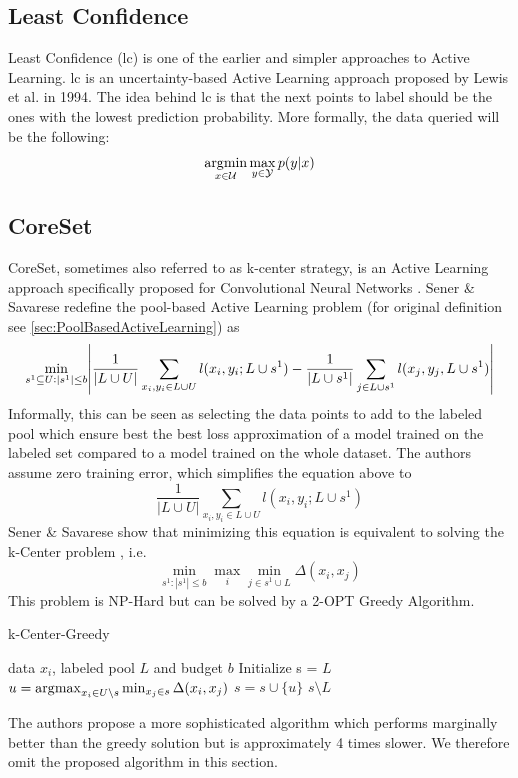 \subsection{Least Confidence}
\label{sec:Related_work:Active_Learning:Least_Confidence}
Least Confidence (\gls{lc}) is one of the earlier and simpler approaches to Active Learning. \gls{lc} is an uncertainty-based Active Learning
approach proposed by Lewis et al. \cite{lewis1994sequential} in 1994. The idea behind \gls{lc} is that the next points to label should be the 
ones with the lowest prediction probability. More formally, the data queried will be the following:
\begin{equation}
    \operatorname*{\arg\!\min}_{x \in \mathcal{U}} \max_{y \in \mathcal{Y}} p(y|x)
\end{equation}

\subsection{CoreSet}
\label{sec:Related_work:Active_Learning:CoreSet}
CoreSet, sometimes also referred to as k-center strategy, is an Active Learning approach specifically proposed for Convolutional Neural
Networks \cite{sener2017active}. Sener \& Savarese redefine the pool-based Active Learning problem (for original definition see 
\ref{sec:PoolBasedActiveLearning}) as 
\begin{equation}
    \min_{s^1 \subseteq U: |s^1| \leq b } \abs{\frac{1}{|L \cup U|} \sum_{x_i,y_i \in L \cup U} l(x_i,y_i;L \cup s^1) - \frac{1}{|L \cup s^1|} 
    \sum_{j \in L \cup s^1} l(x_j,y_j,L \cup s^1)} 
\end{equation}
Informally, this can be seen as selecting the data points to add to the labeled pool which ensure best the best loss approximation
of a model trained on the labeled set compared to a model trained on the whole dataset. The authors assume zero training error, which
simplifies the equation above to
\begin{equation}
    \frac{1}{|L \cup U|} \sum_{x_i,y_i \in L \cup U} l(x_i,y_i;L \cup s^1)
\end{equation}
Sener \& Savarese show that minimizing this equation is equivalent to solving the k-Center problem \cite{wolf2011facility}, i.e.
\begin{equation}
    \min_{s^1: |s^1| \leq b} \max_i \min_{j \in s^1 \cup L}  \Delta (x_i,x_j)
\end{equation}
This problem is NP-Hard but can be solved by a 2-OPT Greedy Algorithm.
\begin{algorithm}
    \caption{k-Center-Greedy} \label{alg:kCenterGreedy}
    \begin{algorithmic}
        \Require data $x_i$, labeled pool $L$ and budget $b$
        \State Initialize s = $L$
        \Repeat
        \State $u = \operatorname*{\arg\!\max}_{x_i \in U \setminus s} \min_{x_j \in s} \Delta(x_i,x_j)$
        \State $s = s \cup \{u\}$
        \return $s \setminus L$
    \end{algorithmic}
\end{algorithm}
The authors propose a more sophisticated algorithm which performs marginally better than the greedy solution but is approximately 
4 times slower. We therefore omit the proposed algorithm in this section.

